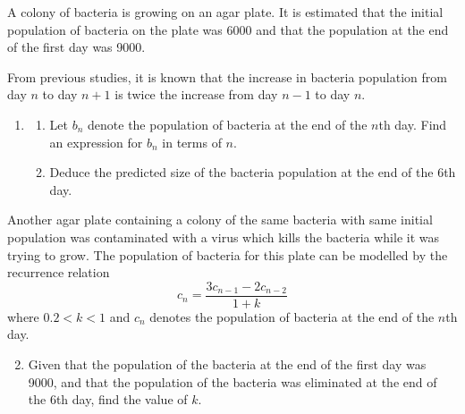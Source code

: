 \begin{problem}
    A colony of bacteria is growing on an agar plate. It is estimated that the initial population of bacteria on the plate was 6000 and that the population at the end of the first day was 9000.

    From previous studies, it is known that the increase in bacteria population from day $n$ to day $n+1$ is twice the increase from day $n-1$ to day $n$.

    \begin{enumerate}
        \item \begin{enumerate}
            \item Let $b_n$ denote the population of bacteria at the end of the $n$th day. Find an expression for $b_n$ in terms of $n$.
            \item Deduce the predicted size of the bacteria population at the end of the 6th day.
        \end{enumerate}
    \end{enumerate}

    Another agar plate containing a colony of the same bacteria with same initial population was contaminated with a virus which kills the bacteria while it was trying to grow. The population of bacteria for this plate can be modelled by the recurrence relation \[c_n = \frac{3c_{n-1} - 2 c_{n-2}}{1+k}\] where $0.2 < k < 1$ and $c_n$ denotes the population of bacteria at the end of the $n$th day.

    \begin{enumerate}
        \setcounter{enumi}{1}
        \item Given that the population of the bacteria at the end of the first day was 9000, and that the population of the bacteria was eliminated at the end of the 6th day, find the value of $k$.
    \end{enumerate}
\end{problem}
